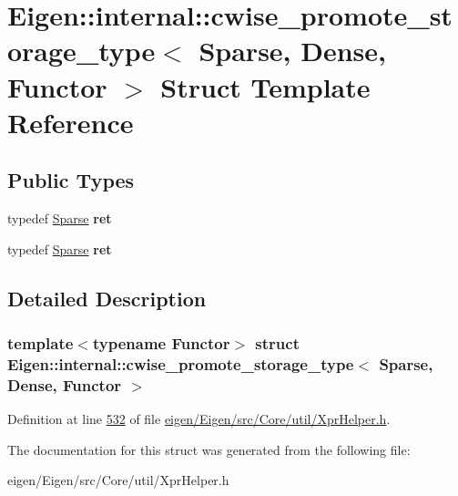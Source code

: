 \hypertarget{struct_eigen_1_1internal_1_1cwise__promote__storage__type_3_01_sparse_00_01_dense_00_01_functor_01_4}{}\section{Eigen\+:\+:internal\+:\+:cwise\+\_\+promote\+\_\+storage\+\_\+type$<$ Sparse, Dense, Functor $>$ Struct Template Reference}
\label{struct_eigen_1_1internal_1_1cwise__promote__storage__type_3_01_sparse_00_01_dense_00_01_functor_01_4}
\subsection*{Public Types}
\begin{DoxyCompactItemize}
\item 
\mbox{\label{struct_eigen_1_1internal_1_1cwise__promote__storage__type_3_01_sparse_00_01_dense_00_01_functor_01_4_aeecffafd07b91b825f576de00a1aa126}} 
typedef \hyperlink{struct_eigen_1_1_sparse}{Sparse} {\bfseries ret}
\item 
\mbox{\label{struct_eigen_1_1internal_1_1cwise__promote__storage__type_3_01_sparse_00_01_dense_00_01_functor_01_4_aeecffafd07b91b825f576de00a1aa126}} 
typedef \hyperlink{struct_eigen_1_1_sparse}{Sparse} {\bfseries ret}
\end{DoxyCompactItemize}


\subsection{Detailed Description}
\subsubsection*{template$<$typename Functor$>$\newline
struct Eigen\+::internal\+::cwise\+\_\+promote\+\_\+storage\+\_\+type$<$ Sparse, Dense, Functor $>$}



Definition at line \hyperlink{eigen_2_eigen_2src_2_core_2util_2_xpr_helper_8h_source_l00532}{532} of file \hyperlink{eigen_2_eigen_2src_2_core_2util_2_xpr_helper_8h_source}{eigen/\+Eigen/src/\+Core/util/\+Xpr\+Helper.\+h}.



The documentation for this struct was generated from the following file\+:\begin{DoxyCompactItemize}
\item 
eigen/\+Eigen/src/\+Core/util/\+Xpr\+Helper.\+h\end{DoxyCompactItemize}
